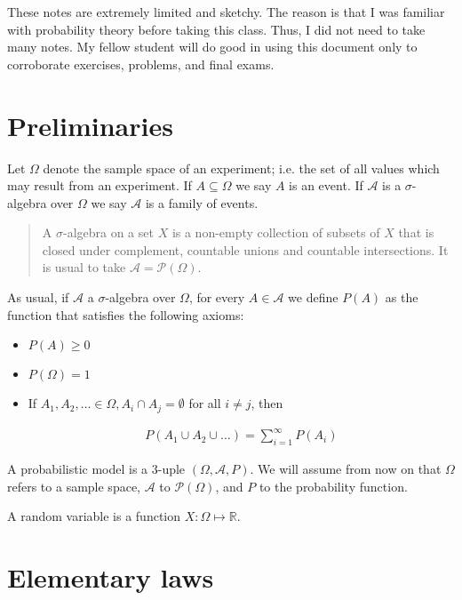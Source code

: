 \documentclass[a4paper, 12pt]{article}
\begin{document}
\pagebreak

These notes are extremely limited and sketchy. The reason is that I was familiar
with probability theory before taking this class. Thus, I did not need to take
many notes. My fellow student will do good in using this document only to
corroborate exercises, problems, and final exams. 

\section{Preliminaries}

Let $\Omega$ denote the sample space of an experiment; i.e. the set of all
values which may result from an experiment. If $A \subseteq \Omega$ we say $A$
is an event. If $\mathcal{A}$ is a $\sigma$-algebra over $\Omega$ we say
$\mathcal{A}$ is a family of events. 

\begin{quote}
    A $\sigma$-algebra on a set $X$ is a non-empty collection of subsets of $X$
    that is closed under complement, countable unions and countable
    intersections. It is usual to take $\mathcal{A} = \mathcal{P}(\Omega)$.
\end{quote}

As usual, if $\mathcal{A}$ a $\sigma$-algebra over $\Omega$, for every $A \in
\mathcal{A}$ we define $P(A)$ as the function that satisfies the following
axioms: 

\begin{itemize}
    \item $P(A) \geq 0$ 
    \item $P(\Omega) = 1$ 
    \item If $A_1, A_2, \ldots \in \Omega, A_i \cap A_j = \emptyset$  for all
        $i \neq j$, then 

        \begin{align*}
            P(A_1 \cup A_2 \cup  \ldots) = \sum_{i=1}^{\infty} P(A_i)
        \end{align*}
\end{itemize}

A probabilistic model is a 3-uple $(\Omega, \mathcal{A}, P)$. We will assume
from now on that $\Omega$ refers to a sample space, $\mathcal{A}$ to
$\mathcal{P}(\Omega)$, and $P$ to the probability function.

A random variable is a function $X : \Omega \mapsto \mathbb{R}$.

\section{Elementary laws}
\end{document}
